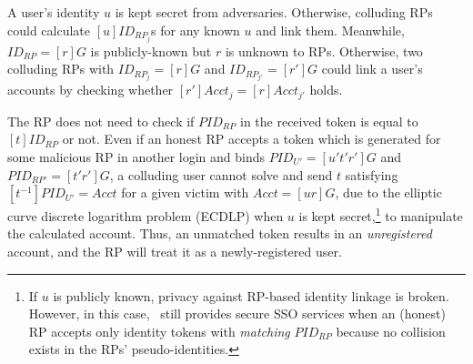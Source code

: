 A user's identity $u$ is kept secret from adversaries. Otherwise, colluding RPs could calculate $[u]ID_{RP_j}$s for any known $u$ and link them.
Meanwhile, $ID_{RP} = [r]G$ is publicly-known but $r$ is unknown to RPs.
Otherwise, two colluding RPs with $ID_{RP_j} = [r]G$ and $ID_{RP_{j'}} = [r']G$ could link a user's accounts by checking whether $[r']Acct_j = [r]Acct_{j'}$ holds.

The RP does not need to check if $PID_{RP}$ in the received token is equal to $[t]{ID_{RP}}$ or not.
Even if an honest RP accepts a token which is generated for some malicious RP in another login and binds $PID_{U'} = [u't'r']G$ and $PID_{RP'}=[t'r']G$,
 a colluding user cannot solve and send $t$ satisfying $[t^{-1}]PID_{U'} = Acct$ for a given victim with $Acct = [ur]G$,
 due to the elliptic curve discrete logarithm problem (ECDLP) when $u$ is kept secret,\footnote{If $u$ is publicly known, privacy against RP-based identity linkage is broken.
    However, in this case, \usso\ still provides secure SSO services when an (honest) RP accepts only identity tokens with \emph{matching} $PID_{RP}$ because no collision exists in the RPs' pseudo-identities.}
    to manipulate the calculated account.
Thus, an unmatched token results in an \emph{unregistered} account, and the RP will treat it as a newly-registered user.
 

